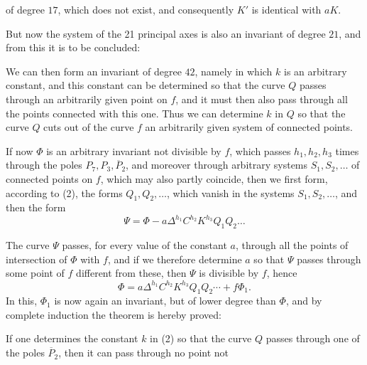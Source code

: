 of degree $17$, which does not exist, and consequently $K'$ is
identical with $aK$.

\begin{center}
\end{center}

But now the system of the 21 principal axes is also an invariant
of degree $21$, and from this it is to be concluded:

\begin{center}
\end{center}

We can then form an invariant of degree $42$,
namely
in which $k$ is an arbitrary constant, and this constant can
be determined so that the curve $Q$ passes through an arbitrarily given
point on $f$, and it must then also pass through all the points
connected with this one. Thus we can determine $k$ in $Q$ so
that the curve $Q$ cuts out of the curve $f$ an arbitrarily
given system of connected points.

If now $\Phi$ is an arbitrary invariant not divisible by $f$,
which passes $h_1, h_2, h_3$ times through the poles $P_7, P_3, \overline{P}_2$,
and moreover through arbitrary systems $S_1, S_2, \ldots$
of connected points on $f$, which may also partly coincide,
then we first form, according to (2), the forms
$Q_1, Q_2, \ldots$, which vanish in the systems $S_1, S_2, \ldots$,
and then the form
\[
\Psi = \Phi - a\Delta^{h_1} C^{h_2} K^{h_3} Q_1 Q_2 \ldots
\]

The curve $\Psi$ passes, for every value of the constant $a$, through
all the points of intersection of $\Phi$ with $f$, and if we therefore
determine $a$ so that $\Psi$ passes through some point of $f$
different from these, then $\Psi$ is divisible by $f$, hence
\[
\Phi = a\Delta^{h_1} C^{h_2} K^{h_3} Q_1 Q_2 \cdots + f\Phi_1.
\]
In this, $\Phi_1$ is now again an invariant, but of lower
degree than $\Phi$, and by complete induction the
theorem is hereby proved:

\begin{center}
\end{center}

If one determines the constant $k$ in (2) so that the curve $Q$ passes
through one of the poles $\overline{P}_2$, then it can pass through no point not
